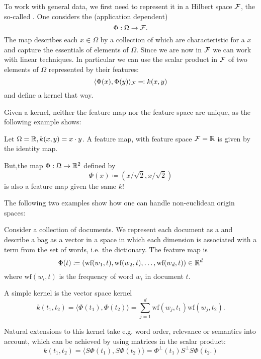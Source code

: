 To work with general data, 
we first need to represent it in a Hilbert space
$\mathcal{F}$, the so-called . 
One considers the (application dependent) 
\[\Phi:\Omega\to\mathcal{F}.\]
The map describes each $x\in\Omega$ by a collection of  which are 
characteristic for a $x$ and capture the essentials of elements of $\Omega$. 
Since we are now in $\mathcal{F}$ we can work with linear techniques. In particular we can use 
the scalar product in $\mathcal{F}$ of two elements of $\Omega$ represented by their features:
\[\langle\Phi(x),\Phi(y) \rangle_{\mathcal{F}}\eqqcolon k(x,y)\]
and define a kernel that way.

\begin{remark}
    Given a kernel, neither the feature map nor the feature space are unique, as the following example shows:
\end{remark}
\begin{example}
    Let $\Omega=\mathbb{R},k(x,y)=x\cdot y$. A feature map, with feature space $\mathcal{F}=\mathbb{R}$ is given by the identity map.

    But,the map $\Phi:\Omega\to\mathbb{R}^2$ defined by 
    \[\Phi(x)\coloneqq (x/\sqrt{2},x/\sqrt{2})\]
    is also a feature map given the same $k$! 
\end{example}
The following two examples show how one can handle non-euclidean origin spaces:
\begin{example}
    Consider a collection of documents. 
    We represent each document as a 
    and describe a bag as a vector in a space in which each dimension is associated
    with a term from the set of words, i.e. the dictionary. The feature map is 
    \[\Phi(t)\coloneqq(\text{wf}(w_1,t),\text{wf}(w_2,t),\dots,\text{wf}(w_d,t))\in\mathbb{R}^d\]
    where $\text{wf}(w_i,t)$ is the frequency of word $w_i$ in document $t$.
    
    A simple kernel is the vector space kernel
    \[k(t_1,t_2)=\langle \Phi(t_1),\Phi(t_2)\rangle=\sum_{j=1}^d \text{wf}(w_j,t_1)\text{wf}(w_j,t_2).\]

    Natural extensions to this kernel take e.g. word order, relevance or semantics into account,
    which can be achieved by using matrices in the scalar product:
    \[k(t_1,t_2)=\langle S\Phi(t_1),S\Phi(t_2)\rangle=\Phi^\perp(t_1)S^\perp S\Phi(t_2.)\]
\end{example}
